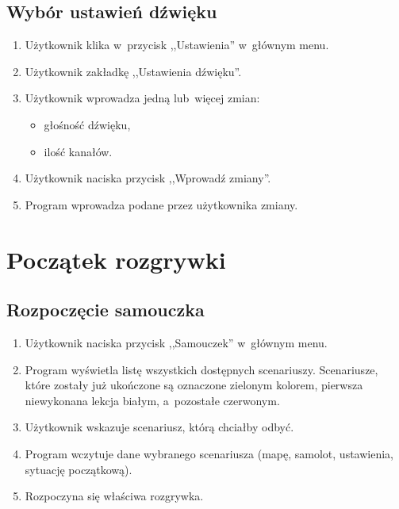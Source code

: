 \documentclass{mwrep}
\begin{document}
\section{Wybór ustawień dźwięku}
\begin{enumerate}
  \item Użytkownik klika w~przycisk ,,Ustawienia'' w~głównym menu.
  \item Użytkownik zakładkę ,,Ustawienia dźwięku''.
  \item Użytkownik wprowadza jedną lub~więcej zmian:
  \begin{itemize}
    \item głośność dźwięku,
    \item ilość kanałów.
  \end{itemize}
  \item Użytkownik naciska przycisk ,,Wprowadź zmiany''.
  \item Program wprowadza podane przez użytkownika zmiany.
\end{enumerate}

\chapter{Początek rozgrywki}
\section{Rozpoczęcie samouczka}
\begin{enumerate}
  \item Użytkownik naciska przycisk ,,Samouczek'' w~głównym menu.
  \item Program wyświetla listę wszystkich dostępnych scenariuszy. Scenariusze, które zostały już ukończone są oznaczone zielonym kolorem, pierwsza niewykonana lekcja białym, a~pozostałe czerwonym.
  \item Użytkownik wskazuje scenariusz, którą chciałby odbyć.
  \item Program wczytuje dane wybranego scenariusza (mapę, samolot, ustawienia, sytuację początkową).
  \item Rozpoczyna się właściwa rozgrywka.
\end{enumerate}
\end{document}
